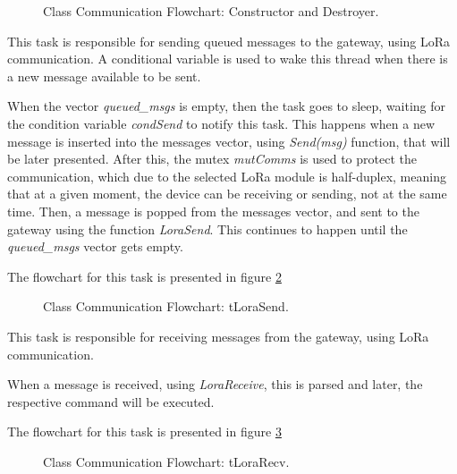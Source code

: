 \begin{figure}[H]
	\centering	
	\caption{Class Communication Flowchart: Constructor and Destroyer.}
	\label{fig:flow_commconstruct}
\end{figure}


This task is responsible for sending queued messages to the gateway, using LoRa communication. A conditional variable is used to wake this thread when there is a new message available to be sent.

When the vector \textit{queued\_msgs} is empty, then the task goes to sleep, waiting for the condition variable \textit{condSend} to notify this task. This happens when a new message is inserted into the messages vector, using \textit{Send(msg)} function, that will be later presented. After this, the mutex \textit{mutComms} is used to protect the communication, which due to the selected LoRa module is half-duplex, meaning that at a given moment, the device can be receiving or sending, not at the same time. Then, a message is popped from the messages vector, and sent to the gateway using the function \textit{LoraSend}. This continues to happen until the \textit{queued\_msgs} vector gets empty.

The flowchart for this task is presented in figure \ref{fig:flow_tlorasend}

\begin{figure}[H]
	\caption{Class Communication Flowchart: tLoraSend.}
	\label{fig:flow_tlorasend}
\end{figure}



This task is responsible for receiving messages from the gateway, using LoRa communication.

When a message is received, using \textit{LoraReceive}, this is parsed and later, the respective command will be executed.

The flowchart for this task is presented in figure \ref{fig:flow_tlorarecv}

\begin{figure}[H]
	\caption{Class Communication Flowchart: tLoraRecv.}
	\label{fig:flow_tlorarecv}
\end{figure}

